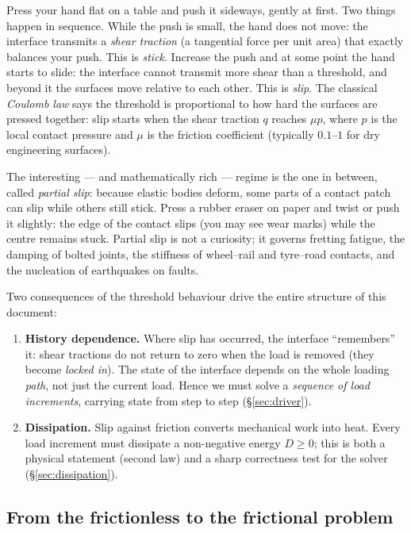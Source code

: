 \documentclass[11pt,a4paper]{article}
\begin{document}
Press your hand flat on a table and push it sideways, gently at first. Two
things happen in sequence. While the push is small, the hand does not move:
the interface transmits a \emph{shear traction} (a tangential force per unit
area) that exactly balances your push. This is \emph{stick}. Increase the
push and at some point the hand starts to slide: the interface cannot
transmit more shear than a threshold, and beyond it the surfaces move
relative to each other. This is \emph{slip}. The classical
\emph{Coulomb law} says the threshold is proportional to how hard the
surfaces are pressed together: slip starts when the shear traction $q$
reaches $\mu p$, where $p$ is the local contact pressure and $\mu$ is the
friction coefficient (typically $0.1$--$1$ for dry engineering surfaces).

The interesting --- and mathematically rich --- regime is the one in
between, called \emph{partial slip}: because elastic bodies deform, some
parts of a contact patch can slip while others still stick. Press a rubber
eraser on paper and twist or push it slightly: the edge of the contact
slips (you may see wear marks) while the centre remains stuck. Partial slip
is not a curiosity; it governs fretting fatigue, the damping of bolted
joints, the stiffness of wheel--rail and tyre--road contacts, and the
nucleation of earthquakes on faults.

Two consequences of the threshold behaviour drive the entire structure of
this document:

\begin{enumerate}
\item \textbf{History dependence.} Where slip has occurred, the interface
  ``remembers'' it: shear tractions do not return to zero when the load is
  removed (they become \emph{locked in}). The state of the interface depends
  on the whole loading \emph{path}, not just the current load. Hence we must
  solve a \emph{sequence of load increments}, carrying state from step to
  step (\S\ref{sec:driver}).
\item \textbf{Dissipation.} Slip against friction converts mechanical work
  into heat. Every load increment must dissipate a non-negative energy
  $D \ge 0$; this is both a physical statement (second law) and a sharp
  correctness test for the solver (\S\ref{sec:dissipation}).
\end{enumerate}

\subsection{From the frictionless to the frictional problem}
\end{document}
